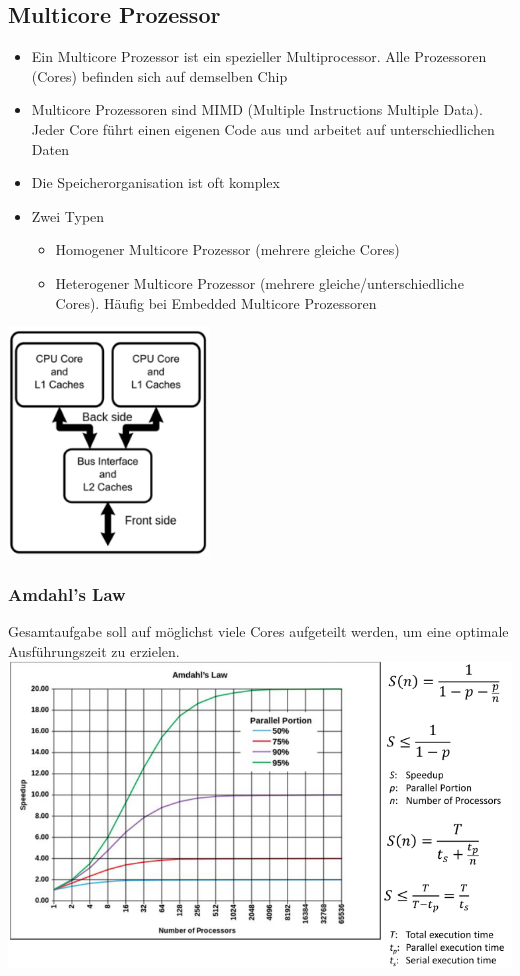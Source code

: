 \subsection{Multicore Prozessor}
\begin{multicols}{2}
	\begin{itemize}
		\item Ein Multicore Prozessor ist ein spezieller Multiprocessor. Alle Prozessoren (Cores) befinden sich auf demselben Chip
		\item  Multicore Prozessoren sind MIMD (Multiple Instructions Multiple Data). Jeder Core führt einen eigenen Code aus und arbeitet auf unterschiedlichen Daten 
		\item Die Speicherorganisation ist oft komplex
		\item Zwei Typen
		\begin{itemize}
			\item Homogener Multicore Prozessor (mehrere gleiche Cores)
			\item Heterogener Multicore Prozessor (mehrere gleiche/unterschiedliche Cores). Häufig bei Embedded Multicore Prozessoren		
		\end{itemize}
	\end{itemize}
\columnbreak
	\includegraphics[width=0.4\textwidth]{images/Multicore/Multicore}
\end{multicols}

\subsubsection{Amdahl's Law}
Gesamtaufgabe soll auf möglichst viele Cores aufgeteilt werden, um eine optimale Ausführungszeit zu erzielen. \\
\includegraphics[width=1\textwidth]{images/Multicore/amdahl}

